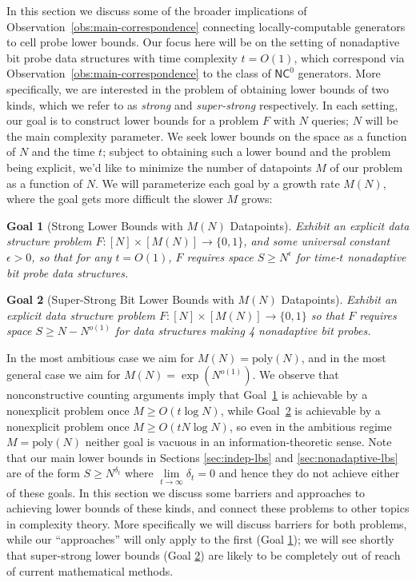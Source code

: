 \documentclass[11pt]{article}
\newtheorem{goal}{Goal}
\newcommand{\B}{\{0,1\}}
\newcommand{\poly}{\mathrm{poly}}
\begin{document}
In this section we discuss some of the broader implications of Observation~\ref{obs:main-correspondence} connecting locally-computable generators to cell probe lower bounds. Our focus here will be on the setting of nonadaptive bit probe data structures with time complexity $t = O(1)$, which correspond via Observation~\ref{obs:main-correspondence} to the class of $\mathsf{NC}^0$ generators. More specifically, we are interested in the problem of obtaining lower bounds of two kinds, which we refer to as \emph{strong} and \emph{super-strong} respectively. In each setting, our goal is to construct lower bounds for a problem $F$ with $N$ queries; $N$ will be the main complexity parameter. We seek lower bounds on the space as a function of $N$ and the time $t$; subject to obtaining such a lower bound and the problem being explicit, we'd like to minimize the number of datapoints $M$ of our problem as a function of $N$. We will parameterize each goal by a growth rate $M(N)$, where the goal gets more difficult the slower $M$ grows:

\begin{goal}[Strong Lower Bounds with $M(N)$ Datapoints]\label{goal:strong}
Exhibit an explicit data structure problem $F: [N] \times [M(N)] \to \B$, and some universal constant $\epsilon > 0$, so that for any $t =O(1)$, $F$ requires space $S \geq N^\epsilon$ for time-$t$ nonadaptive bit probe data structures.
\end{goal}
\begin{goal}[Super-Strong Bit Lower Bounds with $M(N)$ Datapoints]\label{goal:super-strong}
Exhibit an explicit data structure problem $F: [N] \times [M(N)] \to \B$ so that $F$ requires space $S \geq N- N^{o(1)}$ for data structures making 4 nonadaptive bit probes. 
\end{goal}
In the most ambitious case we aim for $M(N)= \poly(N)$, and in the most general case we aim for $M(N) = \exp(N^{o(1)})$. We observe that nonconstructive counting arguments imply that Goal~\ref{goal:strong} is achievable by a nonexplicit problem once $M \geq O(t\log N)$, while Goal~\ref{goal:super-strong} is achievable by a nonexplicit problem once $M \geq O(tN\log N)$, so even in the ambitious regime $M = \poly(N)$ neither goal is vacuous in an information-theoretic sense.
Note that our main lower bounds in Sections \ref{sec:indep-lbs} and \ref{sec:nonadaptive-lbs} are of the form $S \geq N^{\delta_t}$ where $\lim\limits_{t \to \infty} \delta_t = 0$ and hence they do not achieve either of these goals. In this section we discuss some barriers and approaches to achieving lower bounds of these kinds, and connect these problems to other topics in complexity theory. More specifically we will discuss barriers for both problems, while our ``approaches'' will only apply to the first (Goal \ref{goal:strong}); we will see shortly that super-strong lower bounds (Goal \ref{goal:super-strong}) are likely to be completely out of reach of current mathematical methods.
\end{document}
